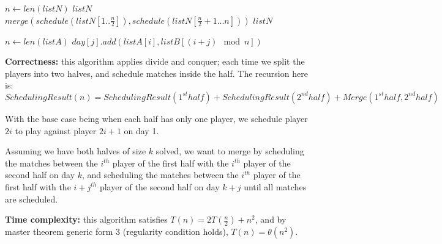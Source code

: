 \documentclass{article}
\begin{document}
\begin{description}
\begin{algorithm}[H]
\begin{algorithmic}[1]
      \State $n \gets len(listN)$
        \State \Return $listN$
      \EndIf
      \State $merge(schedule(listN[1..\frac{n}{2}]), schedule(listN[\frac{n}{2}+1...n]))$
      \State \Return $listN$
    \EndFunction

      \State $n \gets len(listA)$
          \State $day[j].add(listA[i], listB[(i+j) \mod n])$
        \EndFor
      \EndFor
    \EndFunction

    \end{algorithmic}
  \end{algorithm}

  \textbf{Correctness:} this algorithm applies divide and conquer; each time we split the players into two halves, and schedule matches inside the half. The recursion here is: 
  $$SchedulingResult(n) = SchedulingResult(1^{st} half) + SchedulingResult(2^{nd} half) + Merge(1^{st} half, 2^{nd} half)$$ 

  With the base case being when each half has only one player, we schedule player $2i$ to play against player $2i+1$ on day 1. 

  Assuming we have both halves of size $k$ solved, we want to merge by scheduling the matches between the $i^{th}$ player of the first half with the $i^{th}$ player of the second half on day $k$, and scheduling the matches between the $i^{th}$ player of the first half with the $i+j^{th}$ player of the second half on day $k+j$ until all matches are scheduled.

  \textbf{Time complexity:} this algorithm satisfies $T(n) = 2T(\frac{n}{2}) + n^2$, and by master theorem generic form 3 (regularity condition holds), $T(n) = \theta(n^2)$.

\end{description}
\end{document}
